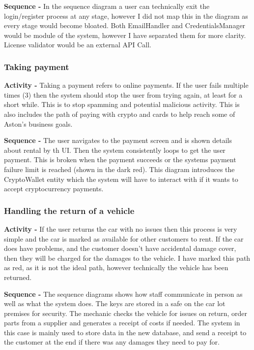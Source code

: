       \noindent\textbf{Sequence -} In the sequence diagram a user can technically exit the login/register process at any stage, however I did not map this in the 
      diagram as every stage would become bloated. Both EmailHandler and CredentialsManager would be module of the system, however I have separated them for 
      more clarity. License validator would be an external API Call. 

    \subsubsection{Taking payment}
      \textbf{Activity -} Taking a payment refers to online payments. If the user fails multiple times (3) then the system should stop
      the user from trying again, at least for a short while. This is to stop spamming and potential malicious activity.
      This is also includes the path of paying with crypto and cards to help reach some of Aston's business goals.

      \noindent\textbf{Sequence -} The user navigates to the payment screen and is shown details about rental by th UI. Then the system consistently
      loops to get the user payment. This is broken when the payment succeeds or the systems payment failure limit is reached (shown in the dark red). 
      This diagram introduces the CryptoWallet entity which the system will have to interact with if it wants to accept cryptocurrency payments.

    \subsubsection{Handling the return of a vehicle}
      \textbf{Activity -} If the user returns the car with no issues then this process is very simple and the car is marked as available for other 
      customers to rent. If the car does have problems, and the customer doesn't have accidental damage cover, then they will be charged for the 
      damages to the vehicle. I have marked this path as red, as it is not the ideal path, however technically the vehicle has been returned.

      \noindent\textbf{Sequence -} The sequence diagrams shows how staff communicate in person as well as what the system does. The keys are stored
      in a safe on the car lot premises for security. The mechanic checks the vehicle for issues on return, order parts from a supplier and generates 
      a receipt of costs if needed. The system in this case is mainly used to store data in the new database, and send a receipt to the customer at the 
      end if there was any damages they need to pay for.

